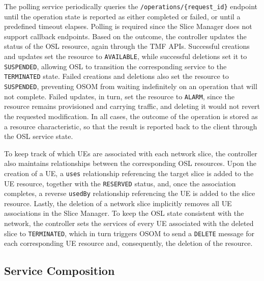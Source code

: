 The polling service periodically queries the \texttt{/operations/\allowbreak \{request\_\allowbreak id\}} endpoint until the operation state is reported as either completed or failed, or until a predefined timeout elapses. Polling is required since the Slice Manager does not support callback endpoints. Based on the outcome, the controller updates the status of the \acs{OSL} resource, again through the \acs{TMF} \acsp{API}. Successful creations and updates set the resource to \texttt{AVAILABLE}, while successful deletions set it to \texttt{SUSPENDED}, allowing \acs{OSL} to transition the corresponding service to the \texttt{TERMINATED} state. Failed creations and deletions also set the resource to \texttt{SUSPENDED}, preventing OSOM from waiting indefinitely on an operation that will not complete. Failed updates, in turn, set the resource to \texttt{ALARM}, since the resource remains provisioned and carrying traffic, and deleting it would not revert the requested modification. In all cases, the outcome of the operation is stored as a resource characteristic, so that the result is reported back to the client through the \acs{OSL} service state.

To keep track of which \acsp{UE} are associated with each network slice, the controller also maintains relationships between the corresponding \acs{OSL} resources. Upon the creation of a \acs{UE}, a \texttt{uses} relationship referencing the target slice is added to the \acs{UE} resource, together with the \texttt{RESERVED} status, and, once the association completes, a reverse \texttt{usedBy} relationship referencing the \acs{UE} is added to the slice resource. Lastly, the deletion of a network slice implicitly removes all \acs{UE} associations in the Slice Manager. To keep the \acs{OSL} state consistent with the network, the controller sets the services of every \acs{UE} associated with the deleted slice to \texttt{TERMINATED}, which in turn triggers OSOM to send a \texttt{DELETE} message for each corresponding \acs{UE} resource and, consequently, the deletion of the resource.

\subsection{Service Composition}

